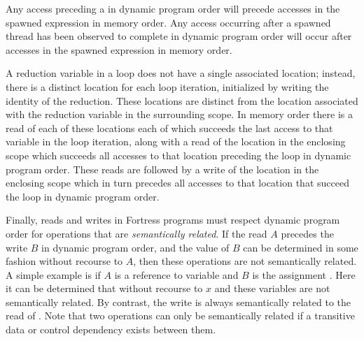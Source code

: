 Any access preceding a  in dynamic program order will
precede accesses in the spawned expression in memory order.  Any
access occurring after a spawned thread has been observed to
complete in dynamic program order will occur after accesses in the
spawned expression in memory order.

A reduction variable in a  loop does not have a single
associated location; instead, there is a distinct location for each
loop iteration, initialized by writing the identity of the reduction.
These locations are distinct from the location associated with the
reduction variable in the surrounding scope.  In memory order there is
a read of each of these locations each of which succeeds the last
access to that variable in the loop iteration, along with a read of
the location in the enclosing scope which succeeds all accesses to
that location preceding the loop in dynamic program order.  These
reads are followed by a write of the location in the enclosing scope
which in turn precedes all accesses to that location that succeed the
loop in dynamic program order.


Finally, reads and writes in Fortress programs must respect dynamic
program order for operations that are \emph{semantically related}.
If the read $A$ precedes the write $B$ in dynamic program order, and
the value of $B$ can be determined in some fashion without recourse to
$A$, then these operations are not semantically related.  A simple
example is if $A$ is a reference to variable  and $B$ is the
assignment .  Here it can be determined that
 without recourse to $x$ and these variables are not
semantically related.  By contrast, the write  is
always semantically related to the read of .  Note that two
operations can only be semantically related if a transitive data or
control dependency exists between them.
